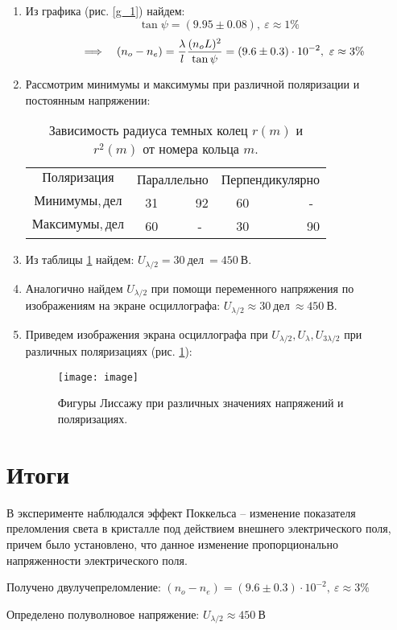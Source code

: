 \documentclass{lab}
\begin{document}
\begin{enumerate}
\item
Из графика (рис. \ref{g_1}) найдем:
$$ \tan \psi = (9.95 \pm 0.08),~\varepsilon \approx 1 \% $$
$$ \quad \Longrightarrow \quad (n_o - n_e) = \frac{\lambda}{l} \frac{(n_oL)^2}{\tan\psi} = (9.6 \pm 0.3) \cdot 10^{-2},~\varepsilon \approx 3 \% $$

\item
Рассмотрим минимумы и максимумы при различной поляризации и постоянным напряжении:

\begin{table}[H]
	\hspace{-1cm}
	\centering
	\begin{tabular}{|c|cr|cr|}
		\hline
		$Поляризация$	&\multicolumn{2}{c|}{Параллельно} &\multicolumn{2}{c|}{Перпендикулярно} \\
		$Минимумы, дел$	&31 &92 &60 &-~ \\
		$Максимумы, дел$&60 &-~ &30 &90 \\ \hline
	\end{tabular}
	\caption{Зависимость радиуса темных колец $ r(m) $ и $ r^2(m) $ от номера кольца $ m $.}
	\label{tab2}
\end{table}

\vspace{-0.5cm}

\item
Из таблицы \ref{tab2} найдем: $ U_{\lambda/2} = 30~дел~= 450~В $.

\item
Аналогично найдем $ U_{\lambda/2} $ при помощи переменного напряжения по изображениям на экране осциллографа: $ U_{\lambda/2} \approx 30~дел~\approx 450~В $.

\item
Приведем изображения экрана осциллографа при $ U_{\lambda/2}, U_{\lambda}, U_{3\lambda/2} $ при различных поляризациях (рис. \ref{image}):
\begin{figure}[H]
	\begin{center}
		\texttt{[image: image]}
		\caption{Фигуры Лиссажу при различных значениях напряжений и поляризациях.}
		\label{image}
	\end{center}
\end{figure}

\end{enumerate}

\vspace{-1.5cm}

\section*{Итоги}

В эксперименте наблюдался эффект Поккельса -- изменение показателя преломления света в кристалле под действием внешнего электрического поля, причем было установлено, что данное изменение пропорционально напряженности электрического поля.

Получено двулучепреломление: $ (n_o - n_e) = (9.6 \pm 0.3) \cdot 10^{-2},~\varepsilon \approx 3 \% $

Определено полуволновое напряжение: $ U_{\lambda/2} \approx 450~В $
\end{document}
